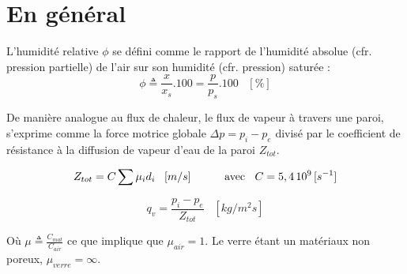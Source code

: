 \documentclass[11pt]{report}
\begin{document}
\section{En général}

L'humidité relative $\phi$ se défini comme le rapport de l'humidité absolue (cfr. pression partielle) de l'air sur son humidité (cfr. pression) saturée :
$$\phi \triangleq \frac{x}{x_s}.100= \frac{p}{p_s}.100\;\;\;[\%] $$

De manière analogue au flux de chaleur, le flux de vapeur à travers une paroi, s'exprime comme la force motrice globale $\Delta p = p_i - p_e$ divisé par le coefficient de résistance à la diffusion de vapeur d'eau de la paroi $Z_{tot}$.

$$Z_{tot} = C \sum \mu_i d_i \;\;\;[m/s]\;\;\;\;\;\;\;\;\;\;\; \textup{avec}\;\;\ C=5,4 \,10^9\, [s^{-1}]$$

$$q_v = \frac{p_i - p_e}{Z_{tot}}\;\;\;[kg/m^2 s]$$

Où $\mu \triangleq \displaystyle \frac{C_{mat}}{C_{air}}$ ce que implique que $\mu_{air}=1$. Le verre étant un matériaux non poreux, $\mu_{verre}= \infty$. \\

\end{document}
